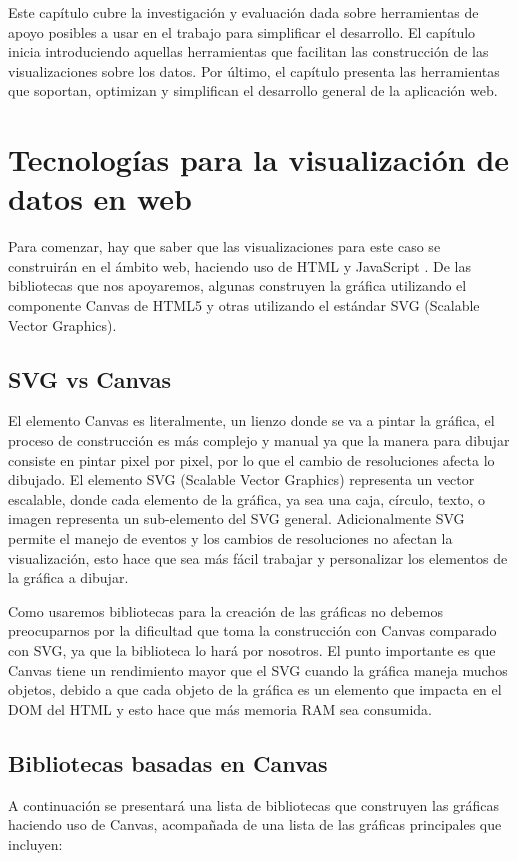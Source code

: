 Este capítulo cubre la investigación y evaluación dada sobre herramientas de apoyo posibles a usar en el trabajo para simplificar el desarrollo. El capítulo inicia introduciendo aquellas herramientas que facilitan las construcción de las visualizaciones sobre los datos. Por último, el capítulo presenta las herramientas que soportan, optimizan y simplifican el desarrollo general de la aplicación web.

\section{Tecnologías para la visualización de datos en web}
Para comenzar, hay que saber que las visualizaciones para este caso se construirán en el ámbito web, haciendo uso de HTML \cite{MozHTML} y JavaScript \cite{MozJS}. De las bibliotecas que nos apoyaremos, algunas construyen la gráfica utilizando el componente Canvas \cite{MozCanvas} de HTML5 y otras utilizando el estándar SVG \cite{W3SVG} (Scalable Vector Graphics).

\subsection[SVG vs Canvas]{SVG vs Canvas \cite{OperaSVGCanvas}}
El elemento Canvas es literalmente, un lienzo donde se va a pintar la gráfica, el proceso de construcción es más complejo y manual ya que la manera para dibujar consiste en pintar pixel por pixel, por lo que el cambio de resoluciones afecta lo dibujado. El elemento SVG (Scalable Vector Graphics) representa un vector escalable, donde cada elemento de la gráfica, ya sea una caja, círculo, texto, o imagen representa un sub-elemento del SVG general. Adicionalmente SVG permite el manejo de eventos y los cambios de resoluciones no afectan la visualización, esto hace que sea más fácil trabajar y personalizar los elementos de la gráfica a dibujar.

Como usaremos bibliotecas para la creación de las gráficas no debemos preocuparnos por la dificultad que toma la construcción con Canvas comparado con SVG, ya que la biblioteca lo hará por nosotros. El punto importante es que Canvas tiene un rendimiento mayor que el SVG cuando la gráfica maneja muchos objetos, debido a que cada objeto de la gráfica es un elemento que impacta en el DOM \cite{W3DOM} del HTML y esto hace que más memoria RAM sea consumida.

\subsection{Bibliotecas basadas en Canvas}
A continuación se presentará una lista de bibliotecas que construyen las gráficas haciendo uso de Canvas, acompañada de una lista de las gráficas principales que incluyen:

